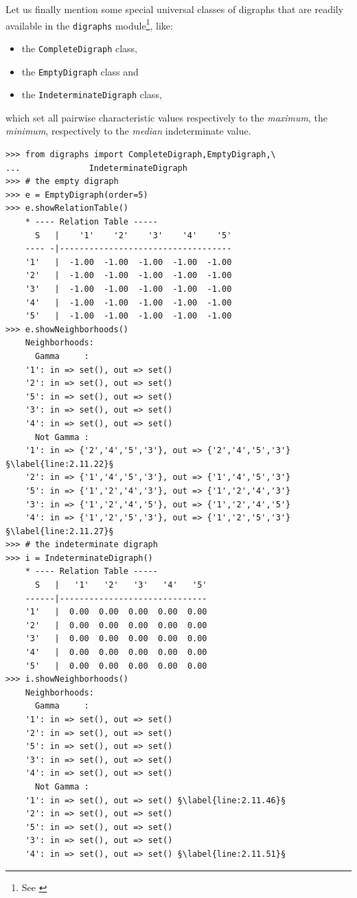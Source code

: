 Let us finally mention some special universal classes of digraphs that are readily available in the \texttt{digraphs} module\footnote{See \citealp{BIS-2021}}, like:
\begin{itemize}[nosep]
\item the \texttt{CompleteDigraph} class,
\item  the \texttt{EmptyDigraph} class and
\item  the \texttt{IndeterminateDigraph} class,
\end{itemize}
which set all pairwise characteristic values respectively to the \emph{maximum}, the \emph{minimum}, respectively to the \emph{median} indeterminate value.
\begin{lstlisting}[caption={Complete, empty and indeterminate digraphs},label=list:2.11]
>>> from digraphs import CompleteDigraph,EmptyDigraph,\
...   			 IndeterminateDigraph
>>> # the empty digraph   
>>> e = EmptyDigraph(order=5)
>>> e.showRelationTable()
    * ---- Relation Table -----
      S   |    '1'    '2'    '3'    '4'	   '5'	  
    ---- -|-----------------------------------
    '1'   |  -1.00  -1.00  -1.00  -1.00	 -1.00	 
    '2'   |  -1.00  -1.00  -1.00  -1.00	 -1.00	 
    '3'   |  -1.00  -1.00  -1.00  -1.00	 -1.00	 
    '4'   |  -1.00  -1.00  -1.00  -1.00	 -1.00	 
    '5'   |  -1.00  -1.00  -1.00  -1.00	 -1.00
>>> e.showNeighborhoods() 
    Neighborhoods:
      Gamma     :
    '1': in => set(), out => set()
    '2': in => set(), out => set()
    '5': in => set(), out => set()
    '3': in => set(), out => set()
    '4': in => set(), out => set()
      Not Gamma :
    '1': in => {'2','4','5','3'}, out => {'2','4','5','3'} §\label{line:2.11.22}§
    '2': in => {'1','4','5','3'}, out => {'1','4','5','3'}
    '5': in => {'1','2','4','3'}, out => {'1','2','4','3'}
    '3': in => {'1','2','4','5'}, out => {'1','2','4','5'}
    '4': in => {'1','2','5','3'}, out => {'1','2','5','3'} §\label{line:2.11.27}§
>>> # the indeterminate digraph
>>> i = IndeterminateDigraph()
    * ---- Relation Table -----
      S   |   '1'   '2'	  '3'	'4'   '5'	  
    ------|------------------------------
    '1'   |  0.00  0.00	 0.00  0.00  0.00	 
    '2'   |  0.00  0.00	 0.00  0.00  0.00	 
    '3'   |  0.00  0.00	 0.00  0.00  0.00	 
    '4'   |  0.00  0.00	 0.00  0.00  0.00	 
    '5'   |  0.00  0.00	 0.00  0.00  0.00	 
>>> i.showNeighborhoods()
    Neighborhoods:
      Gamma     :
    '1': in => set(), out => set()
    '2': in => set(), out => set()
    '5': in => set(), out => set()
    '3': in => set(), out => set()
    '4': in => set(), out => set()
      Not Gamma :
    '1': in => set(), out => set() §\label{line:2.11.46}§
    '2': in => set(), out => set()
    '5': in => set(), out => set()
    '3': in => set(), out => set()
    '4': in => set(), out => set() §\label{line:2.11.51}§
\end{lstlisting}

